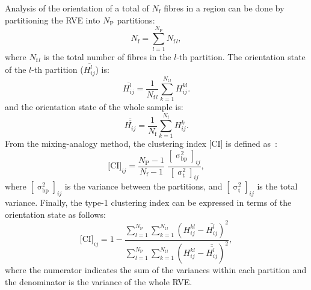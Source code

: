 	Analysis of the orientation of a total of $N_\text{f}$ fibres in a region can be done by partitioning the RVE into $N_\text{P}$ partitions:
\begin{equation}
N_\text{f}=\sum_{l=1}^{N_\text{P}}N_{\text{f}\,l},
\end{equation}
where $N_{\text{f}\,l}$ is the total number of fibres in the $l$-th partition. The orientation state of the $l$-th partition ($\overline{H_{ij}^l}$) is:
\begin{equation}
\overline{H_{ij}^l}=\frac{1}{N_{\text{f}\,l}}\sum_{k=1}^{N_{\text{f}\,l}}H_{ij}^{kl}.
\end{equation}
and the orientation state of the whole sample is:
\begin{equation}
\overline{\overline{H_{ij}}}=\frac{1}{N_\text{f}}\sum_{k=1}^{N_\text{f}}H_{ij}^k.
\end{equation}
From the mixing-analogy method, the clustering index $\text{[CI]}$ is defined as~\autocite{Ranganathan.1990}:
\begin{equation}
{\text{[CI]}}_{ij}=\frac{N_\text{P}-1}{N_\text{f}-1}\;\frac{[\upsigma_\text{bp}^2]_{ij}}{[\upsigma_\text{t}^2]_{ij}},
\end{equation}
where $[\upsigma_\text{bp}^2]_{ij}$ is the variance between the partitions, and $[\upsigma_\text{t}^2]_{ij}$ is the total variance. Finally, the type-1 clustering index can be expressed in terms of the orientation state as follows:
\begin{equation}
{\text{[CI]}}_{ij}=1-\dfrac{
\sum\limits_{l=1}^{N_\text{P}}\sum\limits_{k=1}^{N_{\text{f}\,l}}(H_{ij}^{kl}-\overline{H_{ij}^l})^2
}{
\sum\limits_{l=1}^{N_\text{P}}\sum\limits_{k=1}^{N_{\text{f}\,l}}(H_{ij}^{kl}-\overline{\overline{H_{ij}^l}})^2
},
\end{equation}
where the numerator indicates the sum of the variances within each partition and the denominator is the variance of the whole RVE.

\red
